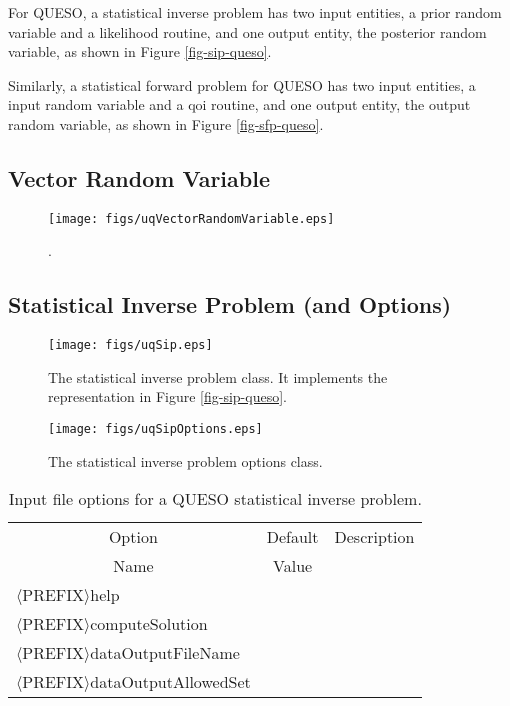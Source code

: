 For QUESO, a statistical inverse problem has two input entities, a prior random variable and
a likelihood routine, and one output entity, the posterior random variable, as shown in Figure \ref{fig-sip-queso}.

Similarly, a statistical forward problem for QUESO has two input entities, a input random variable and
a qoi routine, and one output entity, the output random variable, as shown in Figure \ref{fig-sfp-queso}.

\clearpage
\subsection{Vector Random Variable}

\begin{figure}[h!]
\centerline{
\texttt{[image: figs/uqVectorRandomVariable.eps]}
}
\caption{
{\color{red}{The class diagram for the vector random variable class}}.
}
\label{fig-vector-rv-class}
\end{figure}

\clearpage
\subsection{Statistical Inverse Problem (and Options)}

\begin{figure}[h!]
\centerline{
\texttt{[image: figs/uqSip.eps]}
}
\caption{
The statistical inverse problem class. It implements the representation in Figure \ref{fig-sip-queso}.
}
\label{fig-sip-class}
\end{figure}

\begin{figure}[h!]
\begin{center}
\texttt{[image: figs/uqSipOptions.eps]}
\end{center}
\caption{
The statistical inverse problem options class.
}
\label{fig-sip-options-class}
\end{figure}

\begin{table}[!h]
\begin{center}
\begin{tabular}{|l|c|c|}
\hline
\multicolumn{1}{|c|}{Option}                 & Default & Description \\
\multicolumn{1}{|c|}{Name}                   & Value   &             \\
\hline
\hline
$\langle$PREFIX$\rangle$help                 &         &             \\
\hline
$\langle$PREFIX$\rangle$computeSolution      &         &             \\
\hline
$\langle$PREFIX$\rangle$dataOutputFileName   &         &             \\
\hline
$\langle$PREFIX$\rangle$dataOutputAllowedSet &         &             \\
\hline
\end{tabular}
\end{center}
\caption{
Input file options for a QUESO statistical inverse problem.
}
\label{tab-sip-options}
\end{table}

